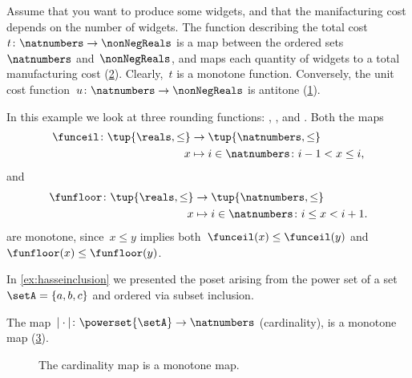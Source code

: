 \begin{example}
  Assume that you want to produce some widgets, and that the manifacturing cost depends on the number of widgets.
  The function describing the total cost~$t\colon \natnumbers\to \nonNegReals$ is a map between the ordered sets~$\natnumbers$ and~$\nonNegReals$, and maps each quantity of widgets to a total manufacturing cost (\cref{fig:total_manufacturing}).
  Clearly,~$t$ is a monotone function.
  Conversely, the unit cost function~$u\colon \natnumbers\to \nonNegReals$ is antitone (\cref{fig:unit_manufacturing}).
\end{example}

\begin{figure}[h!]
  \caption{}
  \label{fig:unit_manufacturing}
\end{figure}

\begin{figure}[h!]
  \caption{}
  \label{fig:total_manufacturing}
\end{figure}



\begin{example}
  \label{ex:rounding-functions}
  In this example we look at three rounding functions: \funceil, \funfloor, and \rtntte. Both the maps
  \begin{equation*}
    \begin{aligned}
      \funceil\colon \tup{\reals,\leq}&\to \tup{\natnumbers,\leq}\\
      x&\mapsto i \in \natnumbers \colon i-1<x\leq i,
    \end{aligned}
  \end{equation*}
  and
  \begin{equation*}
    \begin{aligned}
      \funfloor\colon \tup{\reals,\leq}&\to \tup{\natnumbers,\leq}\\
      x&\mapsto i \in \natnumbers \colon i\leq x< i+1.
    \end{aligned}
  \end{equation*}
  are monotone, since~$x\leq y$ implies both~$\funceil(x)\leq \funceil(y)$ and~$\funfloor(x)\leq\funfloor(y)$.
\end{example}

\begin{example}
  In \cref{ex:hasseinclusion} we presented the poset arising from the power set of a set~$\setA=\{a,b,c\}$ and ordered via subset inclusion.

  The map~$\vert \cdot \vert \colon \powerset{\setA} \to \natnumbers$ (cardinality), is a monotone map (\cref{fig:cardinality}).
  \begin{figure}[h!]
    \begin{center}
    \end{center}
    \caption{The cardinality map is a monotone map. \label{fig:cardinality}}
  \end{figure}
\end{example}

